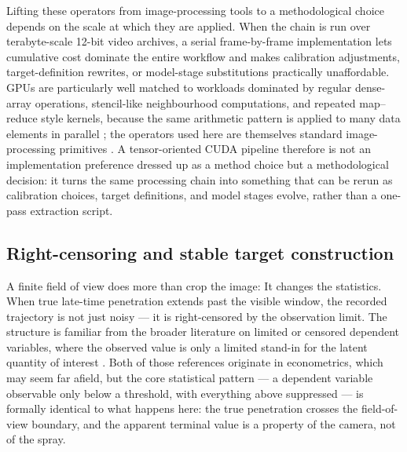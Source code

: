 \documentclass[english, 12pt, a4paper, elec, utf8, a-2b, online]{aaltothesis}
\begin{document}
Lifting these operators from image-processing tools to a methodological choice depends on the scale at which they are applied.
When the chain is run over terabyte-scale 12-bit video archives,
a serial frame-by-frame implementation lets cumulative cost dominate the entire workflow
and makes calibration adjustments, target-definition rewrites, or model-stage substitutions practically unaffordable.
GPUs are particularly well matched to workloads dominated by regular dense-array operations, stencil-like neighbourhood computations,
and repeated map--reduce style kernels, because the same arithmetic pattern is applied to many data elements in parallel
\cite{NickollsBuckGarlandSkadron2008};
the operators used here are themselves standard image-processing primitives \cite{GonzalezWoodsDIP,Szeliski2010Vision}.
A tensor-oriented CUDA pipeline therefore is not an implementation preference dressed up as a method choice but a methodological decision:
it turns the same processing chain into something that can be rerun as calibration choices, target definitions, and model stages evolve,
rather than a one-pass extraction script.

\subsection{Right-censoring and stable target construction}

A finite field of view does more than crop the image: It changes the statistics. 
When true late-time penetration extends past the visible window, the recorded trajectory is not just noisy 
--- it is right-censored by the observation limit. 
The structure is familiar from the broader literature on limited or censored dependent variables, 
where the observed value is only a limited stand-in for the latent quantity of interest \cite{Tobin1958,BuckleyJames1979}. 
Both of those references originate in econometrics, which may seem far afield, but the core statistical pattern 
--- a dependent variable observable only below a threshold, with everything above suppressed 
--- is formally identical to what happens here: 
the true penetration crosses the field-of-view boundary, and the apparent terminal value is a property of the camera, not of the spray.
\end{document}
